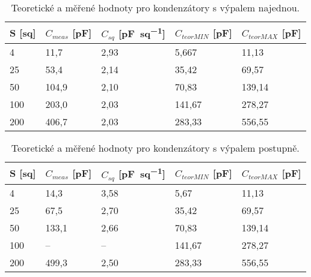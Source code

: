\begin{table}[h!]
    \caption{Teoretické a měřené hodnoty pro kondenzátory s výpalem najednou.}
    \centering
    \def\arraystretch{1.4}
    \begin{tabular}{l|l|l||l|l}
        S [sq] & \(C_{meas} \) [\unit{\pico\farad}] & \(C_{sq} \) [\unit{\pico\farad\per sq}]  & \(C_{teor MIN}\) [\unit{\pico\farad}] & \(C_{teor MAX}\) [\unit{\pico\farad}]\\ \hline
        4      & 11,7   & 2,93  & 5,667     & 11,13    \\ \hline
        25     & 53,4   & 2,14  & 35,42     & 69,57    \\ \hline
        50     & 104,9  & 2,10  & 70,83     & 139,14   \\ \hline
        100    & 203,0  & 2,03  & 141,67    & 278,27   \\ \hline
        200    & 406,7  & 2,03  & 283,33    & 556,55   \\ 
        \end{tabular}
    \label{tab:c_najednou_hodnoty}
\end{table}
\vspace{100pt}
\begin{table}[t!]
    \caption{Teoretické a měřené hodnoty pro kondenzátory s výpalem postupně.}
    \centering
    \def\arraystretch{1.4}
    \begin{tabular}{l|l|l||l|l}
        S [sq] & \(C_{meas} \) [\unit{\pico\farad}] & \(C_{sq} \) [\unit{\pico\farad\per sq}]  & \(C_{teor MIN}\) [\unit{\pico\farad}] & \(C_{teor MAX}\) [\unit{\pico\farad}]\\ \hline
        4       & 14,3  & 3,58  & 5,67       & 11,13   \\ \hline
        25      & 67,5  & 2,70  & 35,42      & 69,57   \\ \hline
        50      & 133,1 & 2,66  & 70,83      & 139,14  \\ \hline
        100     & --    & --    & 141,67     & 278,27  \\ \hline
        200     & 499,3 & 2,50  & 283,33     & 556,55  \\ 

        \end{tabular}
    \label{tab:c_postupne_hodnoty}
\end{table}